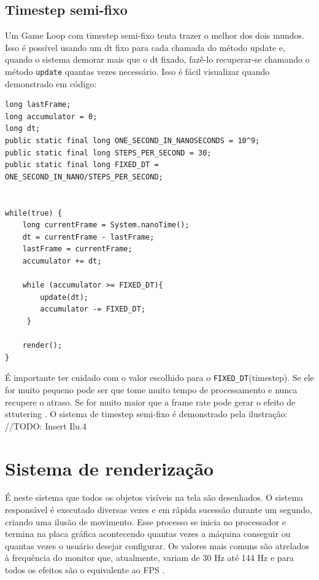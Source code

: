 \documentclass[12pt, 
openright, 
oneside, 
a4paper,    
brazil]{facom-ufu-abntex2}
\begin{document}
\subsection{Timestep semi-fixo}
Um Game Loop com timestep semi-fixo tenta trazer o melhor dos dois mundos. Isso é possível usando um dt fixo para cada chamada do método update e, quando o sistema demorar mais que o dt fixado, fazê-lo recuperar-se  chamando o método \texttt{update} quantas vezes necessário.
Isso é fácil visualizar quando demonstrado em código:
\begin{lstlisting}[caption=Game Loop com timestep semi-fixo]
long lastFrame;
long accumulator = 0;
long dt;
public static final long ONE_SECOND_IN_NANOSECONDS = 10^9;
public static final long STEPS_PER_SECOND = 30;
public static final long FIXED_DT = ONE_SECOND_IN_NANO/STEPS_PER_SECOND;
		
		
while(true) {
	long currentFrame = System.nanoTime(); 
	dt = currentFrame - lastFrame;
	lastFrame = currentFrame;
	accumulator += dt;
	
	while (accumulator >= FIXED_DT){
    	update(dt);
    	accumulator -= FIXED_DT;
 	 }
 			 
	render();
}
\end{lstlisting}
É importante ter cuidado com o valor escolhido para o \texttt{FIXED_DT}(timestep). Se ele for muito pequeno pode ser que tome muito tempo de processamento e nunca recupere o atraso. Se for muito maior que a frame rate pode gerar o efeito de sttutering \cite{GameProgrammingPatterns}.
O sistema de timestep semi-fixo é demonstrado pela ilustração:
\\//TODO: Insert Ilu.4
 
\section{Sistema de renderização}
É neste sistema que todos os objetos visíveis na tela são desenhados. O sistema responsável é executado diversas vezes e em rápida sucessão durante um segundo, criando uma ilusão de movimento. Esse processo se inicia no processador e termina na placa gráfica acontecendo quantas vezes a máquina conseguir ou quantas vezes o usuário desejar configurar. Os valores mais comuns são atrelados à frequência do monitor que, atualmente, variam de 30 Hz até 144 Hz e para todos os efeitos são o equivalente ao FPS \cite{GameEngineArchitecture}.
\end{document}

